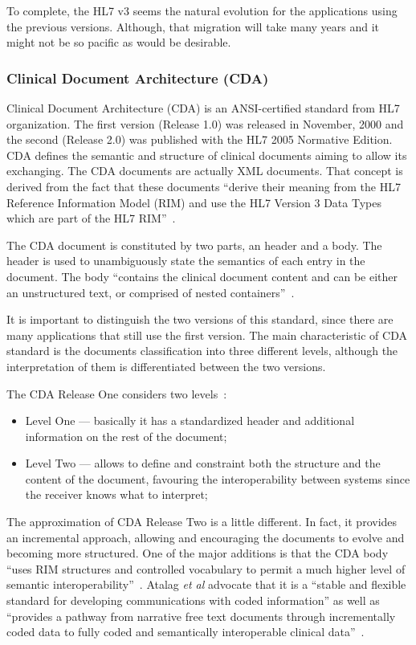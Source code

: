 To complete, the HL7 v3 seems the natural evolution for the applications using the previous versions. Although, that migration will take many years and it might not be so pacific as would be desirable.


\subsubsection{Clinical Document Architecture (CDA)} \label{sec:hl7-cda}
Clinical Document Architecture (CDA) is an ANSI-certified standard from HL7 organization. The first version (Release 1.0) was released in November, 2000 and the second (Release 2.0) was published with the HL7 2005 Normative Edition.~\citep{Seven} CDA defines the semantic and structure of clinical documents aiming to allow its exchanging. The CDA documents are actually XML documents. That concept is derived from the fact that these documents ``derive their meaning from the HL7 Reference Information Model (RIM) and use the HL7 Version 3 Data Types which are part of the HL7 RIM''~\citep{Atalag2010}.

The CDA document is constituted by two parts, an header and a body. The header is used to unambiguously state the semantics of each entry in the document. The body ``contains the clinical document content and can be either an unstructured text, or comprised of nested containers''~\citep{Eichelberg2005}.

It is important to distinguish the two versions of this standard, since there are many applications that still use the first version. The main characteristic of CDA standard is the documents classification into three different levels, although the interpretation of them is differentiated between the two versions.

The CDA Release One considers two levels~\citep{Seven,Eichelberg2005}:
\begin{itemize}
\item Level One --- basically it has a standardized header and additional information on the rest of the document;
\item Level Two --- allows to define and constraint both the structure and the content of the document, favouring the interoperability between systems since the receiver knows what to interpret;
\end{itemize}

The approximation of CDA Release Two is a little different. In fact, it provides an incremental approach, allowing and encouraging the documents to evolve and becoming more structured. One of the major additions is that the CDA body ``uses RIM structures and controlled vocabulary to permit a much higher level of semantic interoperability''~\citep{Seven}. Atalag \textit{et al} advocate that it is a ``stable and flexible standard for developing communications with coded information'' as well as ``provides a pathway from narrative free text documents through incrementally coded data to fully coded and semantically interoperable clinical data''~\citep{Atalag2010}.




